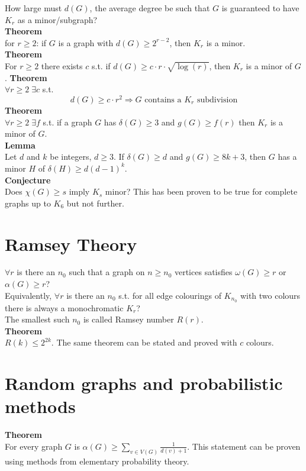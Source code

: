 \documentclass[a4paper, 12pt]{article}
\begin{document}
	How large must $d(G)$, the average degree be such that $G$ is guaranteed to have $K_r$ as a minor/subgraph?\\
	\textbf{Theorem}\\
	for $r \geq 2$: if $G$ is a graph with $d(G) \geq 2^{r-2}$, then $K_r$ is a minor.\\
	\textbf{Theorem}\\
	For $r \geq 2$ there exists $c$ s.t. if $d(G) \geq c\cdot r \cdot \sqrt{\log(r)}$, then $K_r$ is a minor of $G$.\newpage
	\noindent\textbf{Theorem}\\
	$\forall r \geq 2 \; \exists c$ s.t. \[d(G) \geq c\cdot r^2 \Rightarrow G \text{ contains a $K_r$ subdivision}\]
	\textbf{Theorem}\\
	$\forall r \geq 2 \; \exists f$ s.t. if a graph $G$ has $\delta(G) \geq 3$ and $g(G) \geq f(r)$ then $K_r$ is a minor of $G$.\\
	\textbf{Lemma}\\
	Let $d$ and $k$ be integers, $d \geq 3$. If $\delta(G) \geq d$ and $g(G) \geq 8k+3$, then $G$ has a minor $H$ of $\delta(H) \geq d(d-1)^k$.\\
	\textbf{Conjecture}\\
	Does $\chi(G) \geq s$ imply $K_s$ minor?
	This has been proven to be true for complete graphs up to $K_6$ but not further.
	
	\section{Ramsey Theory}
	$\forall r$ is there an $n_0$ such that a graph on $n \geq n_0$ vertices satisfies $\omega(G) \geq r$ or $\alpha(G) \geq r$?\\
	Equivalently, $\forall r$ is there an $n_0$ s.t. for all edge colourings of $K_{n_0}$ with two colours there is always a monochromatic $K_r$?\\
	The smallest such $n_0$ is called Ramsey number $R(r)$.\\
	\textbf{Theorem}\\
	$R(k) \leq 2^{2k}$. 
	The same theorem can be stated and proved with $c$ colours.
	
	\section{Random graphs and probabilistic methods}
	\textbf{Theorem}\\
	For every graph $G$ is $\alpha(G) \geq \sum_{v \in V(G)} \frac{1}{d(v)+1}$. This statement can be proven using methods from elementary probability theory.\\
	
\end{document}

